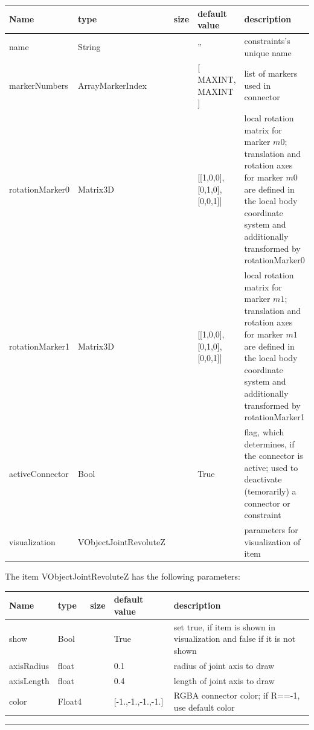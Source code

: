 \begin{center}
  \footnotesize
  \begin{longtable}{| p{4.5cm} | p{2.5cm} | p{0.5cm} | p{2.5cm} | p{6cm} |}
    \hline
    \bf Name & \bf type & \bf size & \bf default value & \bf description \\ \hline
    name &     String &      &     '' &     constraints's unique name\\ \hline
    markerNumbers &     ArrayMarkerIndex &     \tabnewline 2 &     [ MAXINT, MAXINT ] &     list of markers used in connector\\ \hline
    rotationMarker0 &     Matrix3D &      &     [[1,0,0], [0,1,0], [0,0,1]] &     local rotation matrix for marker $m0$; translation and rotation axes for marker $m0$ are defined in the local body coordinate system and additionally transformed by rotationMarker0\\ \hline
    rotationMarker1 &     Matrix3D &      &     [[1,0,0], [0,1,0], [0,0,1]] &     local rotation matrix for marker $m1$; translation and rotation axes for marker $m1$ are defined in the local body coordinate system and additionally transformed by rotationMarker1\\ \hline
    activeConnector &     Bool &      &     True &     flag, which determines, if the connector is active; used to deactivate (temorarily) a connector or constraint\\ \hline
    visualization & VObjectJointRevoluteZ & & & parameters for visualization of item \\ \hline
	  \end{longtable}
	\end{center}
The item VObjectJointRevoluteZ has the following parameters:\vspace{-1cm}\\ 
\begin{center}
  \footnotesize
  \begin{longtable}{| p{4.5cm} | p{2.5cm} | p{0.5cm} | p{2.5cm} | p{6cm} |}
    \hline
    \bf Name & \bf type & \bf size & \bf default value & \bf description \\ \hline
    show &     Bool &      &     True &     set true, if item is shown in visualization and false if it is not shown\\ \hline
    axisRadius &     float &      &     0.1 &     radius of joint axis to draw\\ \hline
    axisLength &     float &      &     0.4 &     length of joint axis to draw\\ \hline
    color &     Float4 &      &     [-1.,-1.,-1.,-1.] &     RGBA connector color; if R==-1, use default color\\ \hline
	  \end{longtable}
	\end{center}
\par\noindent\rule{\textwidth}{0.4pt}
\label{description_ObjectJointRevoluteZ}
